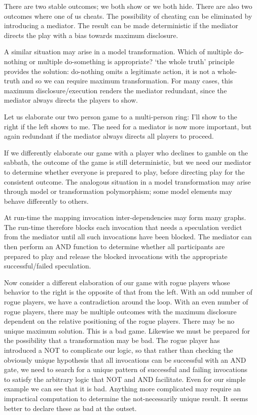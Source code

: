\documentclass{jot}
\begin{document}
There are two stable outcomes; we both show or we both hide. There are also two outcomes where one of us cheats. The possibility of cheating can be eliminated by introducing a mediator. The result can be made deterministic if the mediator directs the play with a bias towards maximum disclosure.

A similar situation may arise in a model transformation. Which of multiple do-nothing or multiple do-something is appropriate? `the whole truth' principle provides the solution: do-nothing omits a legitimate action, it is not a whole-truth and so we can require maximum transformation. For many cases, this maximum disclosure/execution renders the mediator redundant, since the mediator always directs the players to show.

Let us elaborate our two person game to a multi-person ring: I'll show to the right if the left shows to me. The need for a mediator is now more important, but again redundant if the mediator always directs all players to proceed.

If we differently elaborate our game with a player who declines to gamble on the sabbath, the outcome of the game is still deterministic, but we need our mediator to determine whether everyone is prepared to play, before directing play for the consistent outcome. The analogous situation in a model transformation may arise through model or transformation polymorphism; some model elements may behave differently to others.

At run-time the mapping invocation inter-dependencies may form many graphs. The run-time therefore blocks each invocation that needs a speculation verdict from the mediator until all such invocations have been blocked. The mediator can then perform an AND function to determine whether all participants are prepared to play and release the blocked invocations with the appropriate successful/failed speculation.

Now consider a different elaboration of our game with rogue players whose behavior to the right is the opposite of that from the left. With an odd number of rogue players, we have a contradiction around the loop. With an even number of rogue players, there may be multiple outcomes with the maximum disclosure dependent on the relative positioning of the rogue players. There may be no unique maximum solution. This is a bad game. Likewise we must be prepared for the possibility that a transformation may be bad. The rogue player has introduced a NOT to complicate our logic, so that rather than checking the obviously unique hypothesis that all invocations can be successful with an AND gate, we need to search for a unique pattern of successful and failing invocations to satisfy the arbitrary logic that NOT and AND facilitate. Even for our simple example we can see that it is bad. Anything more complicated may require an impractical computation to determine the not-necessarily unique result. It seems better to declare these as bad at the outset.
\end{document}
